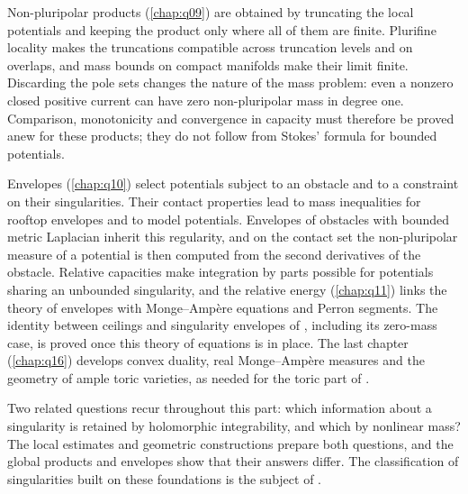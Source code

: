 Non-pluripolar products (\cref{chap:q09}) are obtained by truncating the local potentials and keeping the product only where all of them are finite. Plurifine locality makes the truncations compatible across truncation levels and on overlaps, and mass bounds on compact manifolds make their limit finite. Discarding the pole sets changes the nature of the mass problem: even a nonzero closed positive current can have zero non-pluripolar mass in degree one. Comparison, monotonicity and convergence in capacity must therefore be proved anew for these products; they do not follow from Stokes' formula for bounded potentials.

Envelopes (\cref{chap:q10}) select potentials subject to an obstacle and to a constraint on their singularities. Their contact properties lead to mass inequalities for rooftop envelopes and to model potentials. Envelopes of obstacles with bounded metric Laplacian inherit this regularity, and on the contact set the non-pluripolar measure of a potential is then computed from the second derivatives of the obstacle. Relative capacities make integration by parts possible for potentials sharing an unbounded singularity, and the relative energy (\cref{chap:q11}) links the theory of envelopes with Monge--Amp\`ere equations and Perron segments. The identity between ceilings and singularity envelopes of \cite[Theorem~1.2]{PSWZ26}, including its zero-mass case, is proved once this theory of equations is in place. The last chapter (\cref{chap:q16}) develops convex duality, real Monge--Amp\`ere measures and the geometry of ample toric varieties, as needed for the toric part of \cite{XiaSampleBook}.

Two related questions recur throughout this part: which information about a singularity is retained by holomorphic integrability, and which by nonlinear mass? The local estimates and geometric constructions prepare both questions, and the global products and envelopes show that their answers differ. The classification of singularities built on these foundations is the subject of \cite{XiaSampleBook}.
